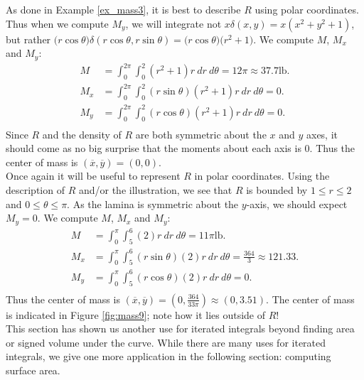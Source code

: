{As done in Example \ref{ex_mass3}, it is best to describe $R$ using polar coordinates.
Thus when we compute $M_y$, we will integrate not $x\delta(x,y) = x(x^2+y^2+1)$, but rather $\big(r\cos\theta\big)\delta(r\cos\theta,r\sin\theta) = \big(r\cos\theta\big)\big(r^2+1\big).$ We compute $M$, $M_x$ and $M_y$:
\begin{align*}
M &= \int_0^{2\pi}\int_0^2 (r^2+1)r\ dr\ d\theta = 12\pi\approx 37.7\text{lb}.\\
M_x &= \int_0^{2\pi}\int_0^2 (r\sin\theta)(r^2+1)r \ dr\ d\theta = 0.\\
M_y &= \int_0^{2\pi}\int_0^2 (r\cos\theta)(r^2+1)r \ dr\ d\theta = 0.\\
\end{align*}
Since $R$ and the density of $R$ are both symmetric about the $x$ and $y$ axes, it should come as no big surprise that the moments about each axis is 0. Thus the center of mass is $(\overline{x},\overline{y})=(0,0)$. 
}\\

{Once again it will be useful to represent $R$ in polar coordinates. Using the description of $R$ and/or the illustration, we see that $R$ is bounded by $1\leq r\leq 2$ and $0\leq\theta\leq\pi$. As the lamina is symmetric about the $y$-axis, we should expect $M_y=0$. We compute $M$, $M_x$ and $M_y$:
\begin{align*}
M &= \int_0^{\pi}\int_5^6 (2)r\ dr\ d\theta = 11\pi\text{lb}.\\
M_x &= \int_0^{\pi}\int_5^6 (r\sin\theta)(2)r\ dr\ d\theta = \frac{364}3\approx 121.33 .\\
M_y &= \int_0^{\pi}\int_5^6 (r\cos\theta)(2)r\ dr\ d\theta = 0.\\
\end{align*}
Thus the center of mass is $(\overline{x},\overline{y}) = \left(0,\frac{364}{33\pi}\right) \approx (0,3.51).$ The center of mass is indicated in Figure \ref{fig:mass9}; note how it lies outside of $R$!
}\\

This section has shown us another use for iterated integrals beyond finding area or signed volume under the curve. While there are many uses for iterated integrals, we give one more application in the following section: computing surface area.

